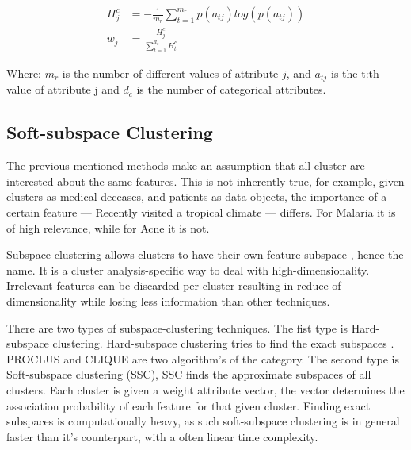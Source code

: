\documentclass[../report.tex]{subfiles}
\begin{document}
\begin{align}
  H_j^c & =  - \frac{1}{m_r} \sum^{m_r}_{t = 1}{p(a_{tj}) log(p(a_{tj}))} 
\label{eq:entropy} \\
  w_j & = \frac{H_j^c}{\sum_{t = 1}^{d_c}{H_t^c}}
  \label{eq:scentropy}
\end{align}

Where:
${m_r}$ is the number of different values of attribute $j$, and $a_{tj}$ is the t:th value of attribute j and $d_c$ is the number of categorical attributes.

\subsection{Soft-subspace Clustering}

The previous mentioned methods make an assumption that all cluster are interested about the same features. This is not inherently true, for example, given clusters as medical deceases, and patients as data-objects, the importance of a certain feature --- Recently visited a tropical climate --- differs. For Malaria it is of high relevance, while for Acne it is not.

Subspace-clustering allows clusters to have their own feature subspace \cite{Deng2016, Jing2007, Jia2018, Kriegler2012}, hence the name. It is a cluster analysis-specific way to deal with high-dimensionality. Irrelevant features can be discarded per cluster resulting in reduce of dimensionality while losing less information than other techniques.

There are two types of subspace-clustering techniques. The fist type is Hard-subspace clustering. Hard-subspace clustering tries to find the exact subspaces \cite{Kriegler2012, Jia2018, Jing2007,Deng2016}. PROCLUS and CLIQUE are two algorithm's of the category. The second type is Soft-subspace clustering (SSC), SSC finds the approximate subspaces of all clusters. Each cluster is given a weight attribute vector, the vector determines the association probability of each feature for that given cluster\cite{Gan2016}. Finding exact subspaces is computationally heavy, as such soft-subspace clustering is in general faster than it's counterpart, with a often linear time complexity.
\end{document}
